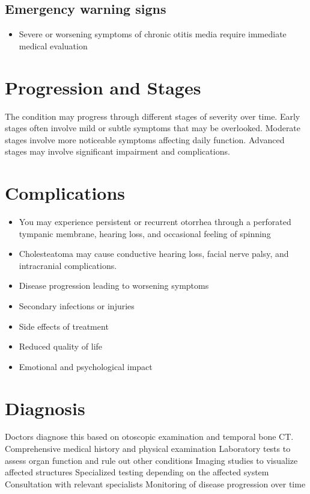 \subsection{Emergency warning signs}
\begin{itemize}[noitemsep]
  \item Severe or worsening symptoms of chronic otitis media require immediate medical evaluation
\end{itemize}
\section{Progression and Stages}
The condition may progress through different stages of severity over time. Early stages often involve mild or subtle symptoms that may be overlooked. Moderate stages involve more noticeable symptoms affecting daily function. Advanced stages may involve significant impairment and complications.
\section{Complications}
\begin{itemize}[noitemsep]
  \item You may experience persistent or recurrent otorrhea through a perforated tympanic membrane, hearing loss, and occasional feeling of spinning
  \item Cholesteatoma may cause conductive hearing loss, facial nerve palsy, and intracranial complications.
  \item Disease progression leading to worsening symptoms
  \item Secondary infections or injuries
  \item Side effects of treatment
  \item Reduced quality of life
  \item Emotional and psychological impact
\end{itemize}
\section{Diagnosis}
Doctors diagnose this based on otoscopic examination and temporal bone CT. Comprehensive medical history and physical examination Laboratory tests to assess organ function and rule out other conditions Imaging studies to visualize affected structures Specialized testing depending on the affected system Consultation with relevant specialists Monitoring of disease progression over time

